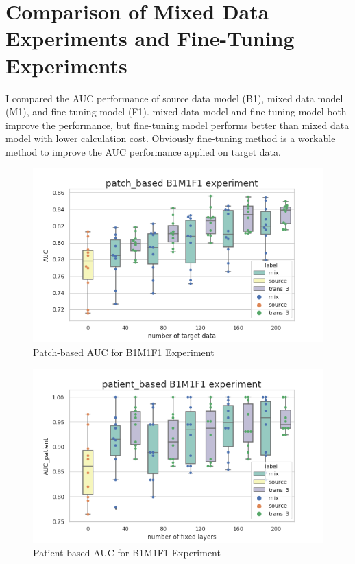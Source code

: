 \section{Comparison of Mixed Data Experiments and Fine-Tuning Experiments}

I compared the AUC performance of source data model (B1), mixed data model (M1), and fine-tuning model (F1). mixed data model and fine-tuning model both improve the performance, but fine-tuning model performs better than mixed data model with lower calculation cost. Obviously fine-tuning method is a workable method to improve the AUC performance applied on target data. 
 \\

\begin{figure}[H]
    \hfil
    \begin{minipage}[t]{0.9\textwidth}
        \includegraphics[width=\textwidth]{fig/B1M1F1_num_patch.png}
        \caption{\label{fig:parallel1} Patch-based AUC for B1M1F1 Experiment}
    \end{minipage}
    \hfil
\end{figure}
\begin{figure}[H]
    \hfil
    \begin{minipage}[t]{0.9\textwidth}
        \includegraphics[width=\textwidth]{fig/B1M1F1_num_patient.png}
        \caption{\label{fig:parallel1} Patient-based AUC for B1M1F1 Experiment}
    \end{minipage}
    \hfil
\end{figure}
